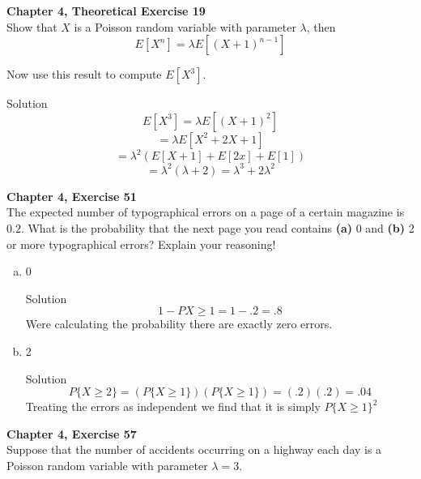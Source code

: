 \documentclass{article}
\begin{document}
\begin{spacing}{1.1}
\newpage
\begin{homeworkProblem}
  {\bf Chapter 4, Theoretical Exercise 19}\\
  Show that $X$ is a Poisson random variable with
  parameter $\lambda$, then
  \[E[ X^n] = \lambda E[ (X + 1)^{n - 1}]\]

  Now use this result to compute $E[ X^3]$.
  
 \begin{homeworkSection}{Solution}
    \[E[ X^3] = \lambda E[ (X + 1)^2]\] 
    \[= \lambda E[ X^2 + 2X + 1]\] 
    \[= \lambda^2 (E[ X + 1] + E[ 2x] + E[ 1])\]
    \[= \lambda^2( \lambda + 2) = \lambda^3 + 2 \lambda^2\]
    
  \end{homeworkSection}
\end{homeworkProblem}

\newpage
\begin{homeworkProblem}
  {\bf Chapter 4, Exercise 51}\\
  The expected number of typographical errors on a page of a certain 
  magazine is $0.2$. What is the probability that the next page you 
  read contains {\bf (a)} 0 and {\bf (b)} 2 or more typographical 
  errors? Explain your reasoning!
 
  \begin{enumerate}[(a)] 
    \item 0
      \begin{homeworkSection}{Solution}
        \[1 - P{ X \ge 1} = 1 - .2 = .8\]
        Were calculating the probability there are exactly zero errors.
      \end{homeworkSection}
    \item 2
      \begin{homeworkSection}{Solution}
      \[ P\{ X \ge 2\} = (P\{ X \ge 1\}) (P\{ X \ge 1\}) = (.2)(.2) = .04\]
      Treating the errors as independent we find that it is simply $P\{ X \ge 1\}^2$
      \end{homeworkSection}
  \end{enumerate}
\end{homeworkProblem}

\newpage
\begin{homeworkProblem}
  {\bf Chapter 4, Exercise 57}\\
  Suppose that the number of accidents occurring on a highway each day 
  is a Poisson random variable with parameter $\lambda = 3$.
 

\end{homeworkProblem}
\end{spacing}
\end{document}
